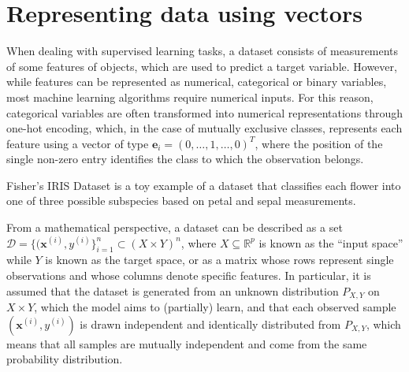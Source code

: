 \documentclass{report}
\begin{document}
\section{Representing data using vectors}
When dealing with supervised learning tasks, a dataset consists of measurements of some features of objects, which are used to predict a target variable. \newline
However, while features can be represented as numerical, categorical or binary variables, most machine learning algorithms require numerical inputs. \newline
For this reason, categorical variables are often transformed into numerical representations through one-hot encoding, which, in the case of mutually exclusive classes, represents each feature using a vector of type $\displaystyle \mathbf{e}_i = (0, \dots, 1, \dots, 0)^T$, where the position of the single non-zero entry identifies the class to which the observation belongs.
\begin{examplebox}
    Fisher's IRIS Dataset is a toy example of a dataset that classifies each flower into one of three possible subspecies based on petal and sepal measurements.
\end{examplebox}
\noindent From a mathematical perspective, a dataset can be described as a set $\displaystyle \mathcal{D} = \{(\mathbf{x}^{(i)}, y^{(i)}\}_{i = 1}^n \subset (X \times Y)^n$, where $\displaystyle X \subseteq \mathbb{R}^p$ is known as the ``input space'' while $\displaystyle Y$ is known as the target space, or as a matrix whose rows represent single observations and whose columns denote specific features. \newline
In particular, it is assumed that the dataset is generated from an unknown distribution $\displaystyle P_{X, Y}$ on $\displaystyle X \times Y$, which the model aims to (partially) learn, and that each observed sample $\displaystyle (\mathbf{x}^{(i)}, y^{(i)})$ is drawn independent and identically distributed from $\displaystyle P_{X, Y}$, which means that all samples are mutually independent and come from the same probability distribution.
\end{document}

